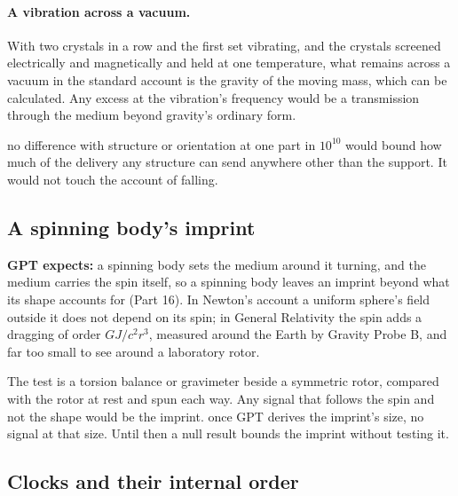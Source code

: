 \paragraph{A vibration across a vacuum.} With two crystals in a row and the first set vibrating, and the crystals screened electrically and magnetically and held at one temperature, what remains across a vacuum in the standard account is the gravity of the moving mass, which can be calculated. Any excess at the vibration's frequency would be a transmission through the medium beyond gravity's ordinary form.

 no difference with structure or orientation at one part in $10^{10}$ would bound how much of the delivery any structure can send anywhere other than the support. It would not touch the account of falling.

\subsection{A spinning body's imprint}\label{sec:spin}

\begin{hypbar}
\textbf{GPT expects:} a spinning body sets the medium around it turning, and the medium carries the spin itself, so a spinning body leaves an imprint beyond what its shape accounts for (Part 16). In Newton's account a uniform sphere's field outside it does not depend on its spin; in General Relativity the spin adds a dragging of order $GJ/c^2r^3$, measured around the Earth by Gravity Probe B,\footnotemark{} and far too small to see around a laboratory rotor.
\end{hypbar}

 The test is a torsion balance or gravimeter beside a symmetric rotor, compared with the rotor at rest and spun each way. Any signal that follows the spin and not the shape would be the imprint.  once GPT derives the imprint's size, no signal at that size. Until then a null result bounds the imprint without testing it.

\subsection{Clocks and their internal order}\label{sec:clocks}

